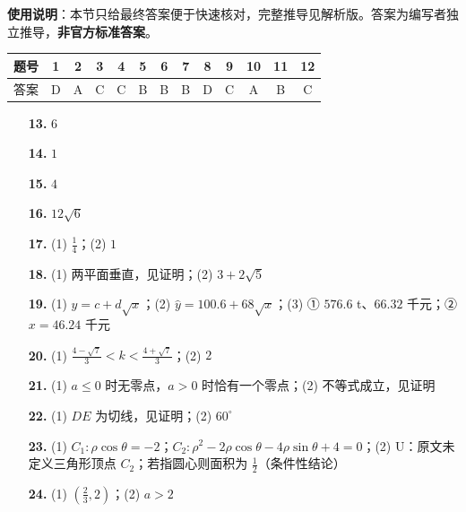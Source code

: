 
\begin{gknotice}
\textbf{使用说明}：本节只给最终答案便于快速核对，完整推导见解析版。答案为编写者独立推导，\textbf{非官方标准答案}。
\end{gknotice}

\begin{center}\begin{tabular}{ccccccccccccc}
\toprule
题号 & 1 & 2 & 3 & 4 & 5 & 6 & 7 & 8 & 9 & 10 & 11 & 12 \\
\midrule
答案 & D & A & C & C & B & B & B & D & C & A & B & C \\
\bottomrule
\end{tabular}\end{center}

\begin{itemize}[leftmargin=2.6em]
  \item[\textbf{13.}] $6$
  \item[\textbf{14.}] $1$
  \item[\textbf{15.}] $4$
  \item[\textbf{16.}] $12\sqrt6$
\end{itemize}

\begin{itemize}[leftmargin=2.6em]
  \item[\textbf{17.}] (1) $\frac14$；(2) $1$
  \item[\textbf{18.}] (1) 两平面垂直，见证明；(2) $3+2\sqrt5$
  \item[\textbf{19.}] (1) $y=c+d\sqrt x$；(2) $\widehat y=100.6+68\sqrt x$；(3) ① $576.6$ t、$66.32$ 千元；② $x=46.24$ 千元
  \item[\textbf{20.}] (1) $\frac{4-\sqrt7}{3}<k<\frac{4+\sqrt7}{3}$；(2) $2$
  \item[\textbf{21.}] (1) $a\le0$ 时无零点，$a>0$ 时恰有一个零点；(2) 不等式成立，见证明
  \item[\textbf{22.}] (1) $DE$ 为切线，见证明；(2) $60^\circ$
  \item[\textbf{23.}] (1) $C_1:\rho\cos\theta=-2$；$C_2:\rho^2-2\rho\cos\theta-4\rho\sin\theta+4=0$；(2) U：原文未定义三角形顶点 $C_2$；若指圆心则面积为 $\frac12$（条件性结论）
  \item[\textbf{24.}] (1) $(\frac23,2)$；(2) $a>2$
\end{itemize}
